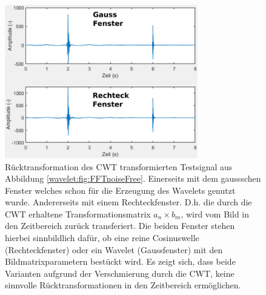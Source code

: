 \begin{figure}
	\centering
	\includegraphics[width=0.75\textwidth]{papers/wavelets/images/19-1_ICWT.png}
	\caption{Rücktransformation des CWT transformierten Testsignal aus Abbildung \ref{wavelet:fig:FFTnoiseFree}. Einerseits mit dem gaussschen Fenster welches schon für die Erzeugung des Wavelets genutzt wurde. Andererseits mit einem Rechteckfenster. D.h. die durch die CWT erhaltene Transformationsmatrix $a_n \times b_m$, wird vom Bild in den Zeitbereich zurück transferiert. Die beiden Fenster stehen hierbei sinnbildlich dafür, ob eine reine Cosinuswelle (Rechteckfenster) oder ein Wavelet (Gaussfenster) mit den Bildmatrixparametern bestückt wird.
	Es zeigt sich, dass beide Varianten aufgrund der Verschmierung durch die CWT, keine sinnvolle Rücktransformationen in den Zeitbereich ermöglichen.}
	\label{wavelet:fig:ICWT}
\end{figure}